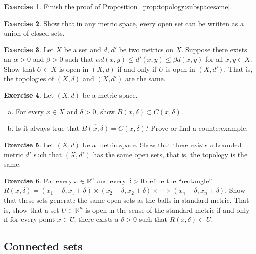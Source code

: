 \documentclass[12pt,openany]{book}
\newcommand{\R}{{\mathbb{R}}}
\newcommand{\myquote}[1]{``#1''}
\theoremstyle{plain}
\theoremstyle{remark}
\theoremstyle{definition}
\newenvironment{exbox}{%
    \def\FrameCommand{\vrule width 1pt \relax\hspace{10pt}}%
    \MakeFramed{\advance\hsize-\width\FrameRestore}%
}{%
    \endMakeFramed
}
\newenvironment{exparts}{%
    \leavevmode\begin{enumerate}[a),noitemsep,topsep=0pt,parsep=0pt,partopsep=0pt]
}{%
    \end{enumerate}
}
\theoremstyle{exercise}
\newtheorem{exercise}{Exercise}[section]
\theoremstyle{example}
\newcommand{\propref}[1]{\hyperref[#1]{Proposition~\ref*{#1}}}
\begin{document}
\begin{exbox}
\begin{exercise}
Finish the proof of \propref{prop:topology:subspacesame}.
\end{exercise}

\begin{exercise}
Show that in any metric space,
every open set can be written as a union of closed sets.
\end{exercise}

\begin{exercise}
Let $X$ be a set and $d$, $d'$ be two metrics on $X$.
Suppose there exists an $\alpha > 0$ and $\beta > 0$
such that $\alpha d(x,y) \leq d'(x,y) \leq \beta d(x,y)$ for all $x,y \in X$.
Show that $U \subset X$ is open in $(X,d)$ if and only if $U$ is open in $(X,d')$.
That is, the topologies of $(X,d)$ and $(X,d')$ are the same.
\end{exercise}

\begin{exercise}
Let $(X,d)$ be a metric space.
\begin{exparts}
\item
For every $x \in X$ and $\delta > 0$, show
$\overline{B(x,\delta)} \subset C(x,\delta)$.
\item
Is it always true that
$\overline{B(x,\delta)} = C(x,\delta)$?  Prove or find a counterexample.
\end{exparts}
\end{exercise}

\begin{exercise}
Let $(X,d)$ be a metric space.  Show that there exists a bounded metric
$d'$ such that $(X,d')$ has the same open sets, that is, the topology is
the same.
\end{exercise}

\begin{exercise}
For every $x \in \R^n$ and every $\delta > 0$ define the \myquote{rectangle}
$R(x,\delta) =
(x_1-\delta,x_1+\delta) \times
(x_2-\delta,x_2+\delta) \times \cdots \times
(x_n-\delta,x_n+\delta)$.  Show that these sets generate the same open
sets as the balls in standard metric.  That is, show that a set $U \subset \R^n$
is open in the sense of the standard metric if and only if for every
point $x \in U$, there exists a $\delta > 0$ such that $R(x,\delta) \subset
U$.
\end{exercise}
\end{exbox}


\subsection{Connected sets}
\end{document}
